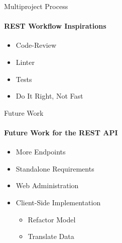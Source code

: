     \begin{frame}[t]{Multiproject Process}\framesubtitle{REST Workflow Inspirations}
        \begin{itemize}
            \item Code-Review
            \item Linter
            \item Tests
            \item Do It Right, Not Fast
        \end{itemize}
    \end{frame}

    \begin{frame}[t]{Future Work}\framesubtitle{Future Work for the REST API}
        \begin{itemize}            
            \item More Endpoints
            \item Standalone Requirements
            \item Web Administration
            \item Client-Side Implementation
            \begin{itemize}
                \item Refactor Model
                \item Translate Data
            \end{itemize}
        \end{itemize}
    \end{frame}

    \begin{frame}[t]{}\framesubtitle{}
        \begin{itemize}
        \end{itemize}
    \end{frame}